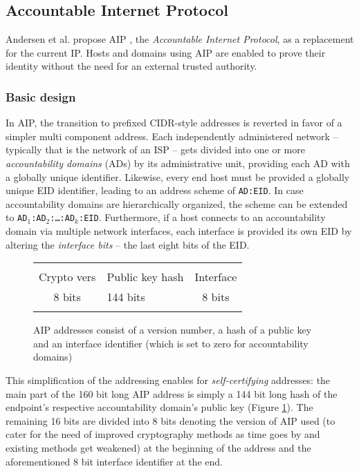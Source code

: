 \documentclass{acm_proc_article-sp}
\begin{document}

\subsection{Accountable Internet Protocol}
\label{sec:aip}
Andersen et al. propose AIP \cite{aip}, the \emph{Accountable Internet Protocol}, as a replacement for the current IP. Hosts and domains using AIP are enabled to prove their identity without the need for an external trusted authority.

\subsubsection{Basic design}
\label{sec:aipbd}

In AIP, the transition to prefixed CIDR-style addresses is reverted in favor of a simpler multi component address. Each independently administered network -- typically that is the network of an ISP -- gets divided into one or more \emph{accountability domains} (ADs) by its administrative unit, providing each AD with a globally unique identifier. Likewise, every end host must be provided a globally unique EID identifier, leading to an address scheme of \texttt{AD:EID}. In case accountability domains are hierarchically organized, the scheme can be extended to \texttt{AD$_1$:AD$_2$:\ldots:AD$_k$:EID}. Furthermore, if a host connects to an accountability domain via multiple network interfaces, each interface is provided its own EID by altering the \emph{interface bits} -- the last eight bits of the EID.

\begin{figure}[h!]
	\label{fig:aipadr}
	\begin{tabularx}{0.47\textwidth}{|c|C|c|}
		\hline & & \\
 		Crypto vers & Public key hash & Interface \\
		8 bits & 144 bits & 8 bits \\ & & \\
		\hline
	\end{tabularx}
	\caption{AIP addresses consist of a version number, a hash of a public key and an interface identifier 		(which is set to zero for accountability domains) \cite{aip}}
\end{figure}

This simplification of the addressing enables for \emph{self-certifying} addresses: the main part of the 160 bit long AIP address is simply a 144 bit long hash of the endpoint's respective accountability domain's public key (Figure \ref{fig:aipadr}). The remaining 16 bits are divided into 8 bits denoting the version of AIP used (to cater for the need of improved cryptography methods as time goes by and existing methods get weakened) at the beginning of the address and the aforementioned 8 bit interface identifier at the end.
\end{document}
